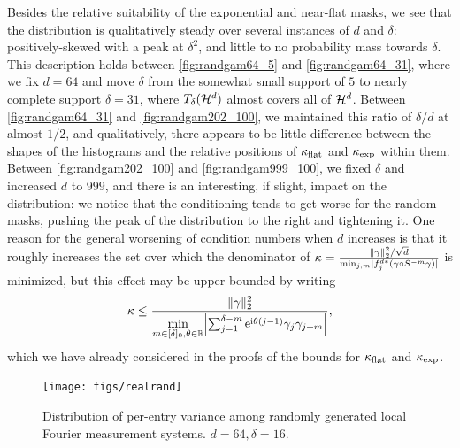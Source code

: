 Besides the relative suitability of the exponential and near-flat masks, we see that the distribution is qualitatively steady over several instances of $d$ and $\delta$: positively-skewed with a peak at $\delta^2$, and little to no probability mass towards $\delta$.  This description holds between \cref{fig:randgam64_5} and \cref{fig:randgam64_31}, where we fix $d = 64$ and move $\delta$ from the somewhat small support of $5$ to nearly complete support $\delta = 31$, where $T_\delta(\mathcal{H}^d)$ almost covers all of $\mathcal{H}^d$.  Between \cref{fig:randgam64_31} and \cref{fig:randgam202_100}, we maintained this ratio of $\delta / d$ at almost $1/2$, and qualitatively, there appears to be little difference between the shapes of the histograms and the relative positions of $\kappa_{\rm flat}$ and $\kappa_{\rm exp}$ within them.  Between \cref{fig:randgam202_100} and \cref{fig:randgam999_100}, we fixed $\delta$ and increased $d$ to $999$, and there is an interesting, if slight, impact on the distribution: we notice that the conditioning tends to get worse for the random masks, pushing the peak of the distribution to the right and tightening it.  One reason for the general worsening of condition numbers when $d$ increases is that it roughly increases the set over which the denominator of $\kappa = \frac{\lVert\gamma\rVert_2^2 / \sqrt{d}}{\min_{j, m} \lvert f_j^{d*}(\gamma \circ S^{-m} \gamma)\rvert}$ is minimized, but this effect may be upper bounded by writing \[\kappa \le \dfrac{\norm{\gamma}_2^2}{\min\limits_{m \in [\delta]_0, \theta \in \R} \abs*{\sum_{j = 1}^{\delta - m} \ee^{\ii \theta (j - 1)} \gamma_j \gamma_{j + m}}},\] which we have already considered in the proofs of the bounds for $\kappa_{\rm flat}$ and $\kappa_{\rm exp}$.

\begin{figure}
  \centering
  \texttt{[image: figs/realrand]}
  \caption{Distribution of per-entry variance among randomly generated local Fourier measurement systems.  $d = 64, \delta = 16$.}
  \label{fig:realrand}
\end{figure}

